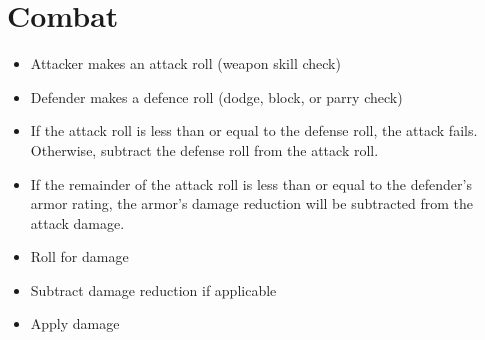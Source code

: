 \chapter{Combat}\label{combat}

\begin{itemize}
    \item Attacker makes an attack roll (weapon skill check)
    \item Defender makes a defence roll (dodge, block, or parry check)
    \item If the attack roll is less than or equal to the defense roll, the
            attack fails. Otherwise, subtract the defense roll from the
            attack roll.
    \item If the remainder of the attack roll is less than or equal to the
            defender's armor rating, the armor's damage reduction will be
            subtracted from the attack damage.
    \item Roll for damage
    \item Subtract damage reduction if applicable
    \item Apply damage
\end{itemize}
